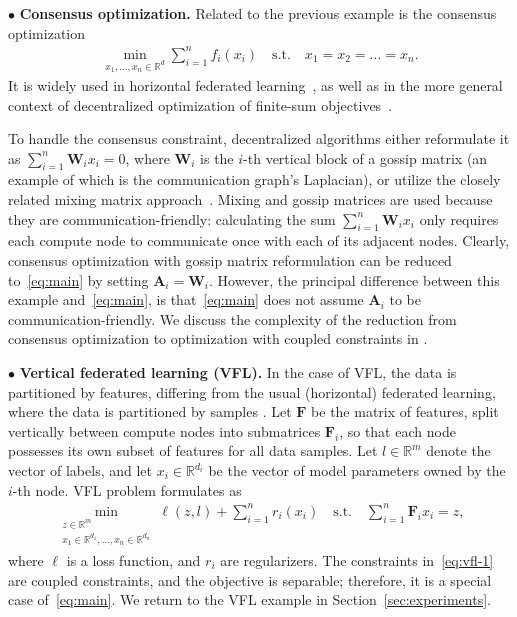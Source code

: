 \documentclass{article}
\newcommand{\qst}{\quad \text{s.t.} \quad}
\newcommand{\R}{\mathbb{R}}
\newcommand{\sX}{\R^d}
\newcommand{\sY}{\R^m}
\newcommand{\mA}{\mathbf{A}}
\newcommand{\mF}{\mathbf{F}}
\newcommand{\mW}{\mathbf{W}}
\begin{document}
$\bullet$ \textbf{Consensus optimization.}
Related to the previous example is the consensus optimization~\cite{boyd2011distributed}
\begin{align*}
  \min_{x_1,\ldots,x_n \in \sX} \sum_{i=1}^n f_i(x_i) \qst x_1 = x_2 = \ldots = x_n.
\end{align*}
It is widely used in horizontal federated learning~\cite{kairouz2021advances}, as well as in the more general context of decentralized optimization of finite-sum objectives~\cite{gorbunov2022recent, scaman2017optimal}. 

To handle the consensus constraint, decentralized algorithms either reformulate it as $\sum_{i=1}^n \mW_i x_i = 0$, where $\mW_i$ is the $i$-th vertical block of a gossip matrix (an example of which is the communication graph's Laplacian), or utilize the closely related mixing matrix approach~\cite{gorbunov2022recent}.
Mixing and gossip matrices are used because they are communication-friendly: calculating the sum $\sum_{i=1}^n \mW_i x_i$ only requires each compute node to communicate once with each of its adjacent nodes.
Clearly, consensus optimization with gossip matrix reformulation can be reduced to~\eqref{eq:main} by setting $\mA_i = \mW_{i}$.
However, the principal difference between this example and~\eqref{eq:main}, is that~\eqref{eq:main} does not assume $\mA_i$ to be communication-friendly.
We discuss the complexity of the reduction from consensus optimization to optimization with coupled constraints in .

$\bullet$ \textbf{Vertical federated learning (VFL).} 
In the case of VFL, the data is partitioned by features, differing from the usual (horizontal) federated learning, where the data is partitioned by samples \cite{yang2019federated, boyd2011distributed}.
Let $\mF$ be the matrix of features, split vertically between compute nodes into submatrices $\mF_i$, so that each node possesses its own subset of features for all data samples. 
Let $l \in \sY$ denote the vector of labels, and let $x_i \in \R^{d_i}$ be the vector of model parameters owned by the $i$-th node.
VFL problem formulates as
\begin{align}\label{eq:vfl-1}
  \min_{\substack{z \in \sY \\ x_1 \in \R^{d_1},\ldots,x_n \in \R^{d_n}}} \ell(z, l) + \sum_{i=1}^n r_i(x_i) \qst \sum_{i=1}^n \mF_i x_i = z,
\end{align}
where $\ell$ is a loss function, and $r_i$ are regularizers.
The constraints in~\eqref{eq:vfl-1} are coupled constraints, and the objective is separable; therefore, it is a special case of~\eqref{eq:main}.
We return to the VFL example in Section~\ref{sec:experiments}.
\end{document}
